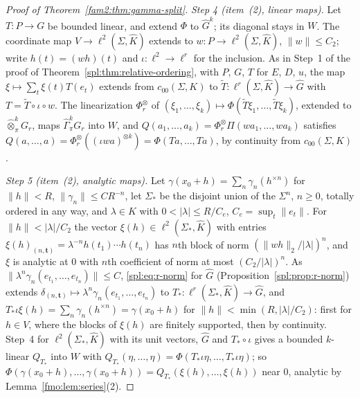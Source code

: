 \documentclass[11pt]{amsart}
\theoremstyle{definition}
\theoremstyle{remark}
\numberwithin{equation}{section}
\newcommand{\abs}[1]{\lvert #1\rvert}
\newcommand{\norm}[1]{\lVert #1\rVert}
\newcommand{\Kh}{\widehat K}
\theoremstyle{plain}
\theoremstyle{definition}
\theoremstyle{plain}
\newcommand{\hot}{\mathbin{\widehat\otimes}}
\newcommand{\hGamma}{\widehat\Gamma}
\begin{document}
\begin{proof}[Proof of Theorem~\ref{fam2:thm:gamma-split}]
\emph{Step 4 (item~(2), linear maps).} Let $T\colon P\to G$ be bounded linear, and extend $\Phi$ to $\widehat G^k$; its
diagonal stays in $W$. The coordinate map $V\to\ell^2(\Sigma,\Kh)$ extends to $w\colon P\to\ell^2(\Sigma,\Kh)$,
$\norm w\le C_2$; write $h(t)=(wh)(t)$ and $\iota\colon\ell^2\to\ell^r$ for the inclusion. As in Step~1 of the proof of
Theorem~\ref{spl:thm:relative-ordering}, with $P$, $G$, $T$ for $E$, $D$, $u$, the map $\xi\mapsto\sum_t\xi(t)T(e_t)$
extends from $c_{00}(\Sigma,K)$ to $\widetilde T\colon\ell^r(\Sigma,\Kh)\to\widehat G$ with $T=\widetilde T\circ\iota\circ w$.
The linearization $\Phi_r^\otimes$ of $(\xi_1,\dots,\xi_k)\mapsto\Phi(\widetilde T\xi_1,\dots,\widetilde T\xi_k)$, extended
to $\hot^k_\pi G_r$, maps $\hGamma^k_\pi G_r$ into $W$, and $Q(a_1,\dots,a_k)=\Phi_r^\otimes\Pi(wa_1,\dots,wa_k)$ satisfies
$Q(a,\dots,a)=\Phi_r^\otimes((\iota wa)^{\otimes k})=\Phi(Ta,\dots,Ta)$, by continuity from $c_{00}(\Sigma,K)$.

\emph{Step 5 (item~(2), analytic maps).} Let $\gamma(x_0+h)=\sum_n\gamma_n(h^{\times n})$ for $\norm h<R$,
$\norm{\gamma_n}\le CR^{-n}$, let $\Sigma_*$ be the disjoint union of the $\Sigma^n$, $n\ge0$, totally ordered in any way,
and $\lambda\in K$ with $0<\abs\lambda\le R/C_e$, $C_e=\sup_t\norm{e_t}$. For $\norm h<\abs\lambda/C_2$ the vector
$\xi(h)\in\ell^2(\Sigma_*,\Kh)$
with entries $\xi(h)_{(n,\mathbf t)}=\lambda^{-n}h(t_1)\cdots h(t_n)$ has $n$th block of norm
$(\norm{wh}_2/\abs\lambda)^n$, and $\xi$ is analytic at $0$ with $n$th coefficient of norm at most $(C_2/\abs\lambda)^n$. As
$\norm{\lambda^n\gamma_n(e_{t_1},\dots,e_{t_n})}\le C$, \eqref{spl:eq:r-norm} for $\widehat G$
(Proposition~\ref{spl:prop:r-norm}) extends $\delta_{(n,\mathbf t)}\mapsto
\lambda^n\gamma_n(e_{t_1},\dots,e_{t_n})$ to $T_*\colon\ell^r(\Sigma_*,\Kh)\to\widehat G$, and $T_*\iota\xi(h)=
\sum_n\gamma_n(h^{\times n})=\gamma(x_0+h)$ for $\norm h<\min(R,\abs\lambda/C_2)$: first for $h\in V$, where the blocks of
$\xi(h)$ are finitely supported, then by continuity. Step~4 for
$\ell^2(\Sigma_*,\Kh)$ with its unit vectors, $\widehat G$ and $T_*\circ\iota$ gives a bounded $k$-linear $Q_{T_*}$ into $W$
with $Q_{T_*}(\eta,\dots,\eta)=\Phi(T_*\iota\eta,\dots,T_*\iota\eta)$; so $\Phi(\gamma(x_0+h),\dots,\gamma(x_0+h))=
Q_{T_*}(\xi(h),\dots,\xi(h))$ near $0$, analytic by Lemma~\ref{fmo:lem:series}(2).


\end{proof}
\end{document}
